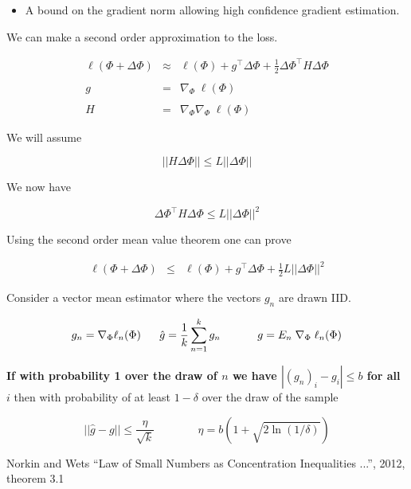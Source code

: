 {{\begin{itemize}
  \vfill
\item A bound on the gradient norm allowing high confidence gradient estimation.
\end{itemize}
  


We can make a second order approximation to the loss.

\begin{eqnarray*}
  \ell(\Phi + \Delta \Phi) & \approx & \ell(\Phi) + g^\top \Delta \Phi + \frac{1}{2} \Delta \Phi^\top H \Delta \Phi \\
  \\
  g & = & \nabla_\Phi\;\ell(\Phi) \\
  \\
  H & = & \nabla_\Phi \nabla_\Phi\; \ell(\Phi)
\end{eqnarray*}



We will assume

$$||H\Delta \Phi|| \leq L||\Delta \Phi||$$

We now have

\vfill
$$\Delta \Phi^\top H \Delta \Phi \leq L ||\Delta \Phi||^2$$

\vfill
Using the second order mean value theorem one can prove

\begin{eqnarray*}
  \ell(\Phi + \Delta \Phi)  & \leq &    \ell(\Phi) + g^\top \Delta \Phi + \frac{1}{2} L ||\Delta \Phi||^2
\end{eqnarray*}



Consider a vector mean estimator where the vectors $g_n$ are drawn IID.

$$g_n = \nabla_\Phi \ell_n(\Phi) \;\;\;\;\;\;\hat{g} = \frac{1}{k} \sum_{n=1}^k g_n \;\;\;\; \;\;\;\;\;\;\;\; g = E_{n}\;\nabla_\Phi\;\ell_n(\Phi)$$

\vfill
{\bf If with probability 1 over the draw of $n$ we have $|(g_n)_i - g_i| \leq b$ for all $i$} then with probability of at least $1-\delta$ over the draw of the sample

\vfill

$$||\hat{g} - g|| \leq \frac{\eta}{\sqrt{k}} \;\;\;\;\;\;\;\;\;\;\;\;\;\; \eta = b\left(1 + \sqrt{2 \ln (1/ \delta) }\right)$$


\vfill
{\huge Norkin and Wets ``Law of Small Numbers as Concentration Inequalities ...'', 2012, theorem 3.1}

}}
